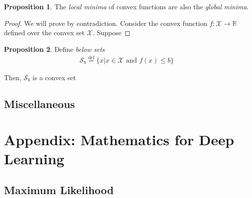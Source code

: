 \documentclass[a4paper,12pt]{article}
\theoremstyle{definition}
\newtheorem*{proposition}{Proposition}
\newcommand{\R}{\mathbb{R}}
\begin{document}
\begin{proposition}
    The \emph{local minima} of convex functions are also the \emph{global minima}.
    \begin{proof}
        We will prove by contradiction.
        Consider the convex function $f: \mathcal{X} \to \R$ defined over the convex set $\mathcal{X}$.
        Suppose 
        
    \end{proof}
\end{proposition}

\begin{proposition}
    Define \emph{below sets}
    \begin{equation*}
        \begin{aligned}
            \mathcal{S}_b \stackrel{\mathrm{def}}{=} \{x | x \in \mathcal{X} \text{ and } f(x) \leq b\}
        \end{aligned}
    \end{equation*}

    Then,
    $\mathcal{S}_b$ is a convex set
\end{proposition}

\newpage
\subsection*{Miscellaneous}


\section{Appendix: Mathematics for Deep Learning}
\subsection{Maximum Likelihood}
\end{document}
